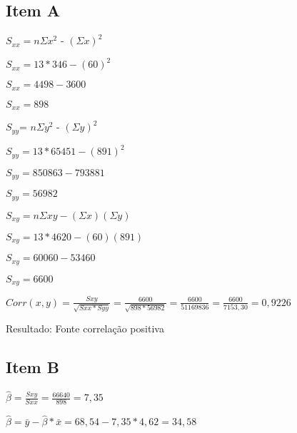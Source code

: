\documentclass{article}
\begin{document}
    \subsection*{Item A}
    
    
            \begin{flushleft}

            $S_{xx} = n\Sigma x^2$ - $(\Sigma x)^2$ 
            
            $S_{xx} = 13*346-(60)^2$

            $S_{xx} = 4498-3600$
            
            $S_{xx}= 898$

            \end{flushleft}

            \begin{flushleft}
                $S_{yy}$= $n\Sigma y^2$ - $(\Sigma y)^2$

                $S_{yy} = 13*65451-(891)^2$

                $S_{yy} = 850863-793881$

                $S_{yy} = 56982$

            \end{flushleft}

            \begin{flushleft}

            $S_{xy} = n\Sigma xy-(\Sigma x)(\Sigma y)$
            
            $S_{xy} = 13*4620-(60)(891)$
            
            $S_{xy} = 60060-53460$ 
            
            $S_{xy} = 6600$ 

            \end{flushleft}

            \begin{flushleft}
                $Corr(x,y) = \frac{Sxy}{\sqrt{Sxx * Syy}} = \frac{6600}{\sqrt{898 * 56982}} =
                 \frac{6600}{51169836} =\frac{6600}{7153,30} = 0,9226 $
            \end{flushleft}
    
            Resultado: Fonte correlação positiva

    \subsection{Item B}

            \begin{flushleft}

                $\hat{\beta} = \frac{Sxy}{Sxx} = \frac{66640}{898} = 7,35$

                $\hat{\beta} = \bar{y} - \hat{\beta} * \bar{x} = 68,54-7,35* 4,62=34,58$
            \end{flushleft}
            
\end{document}
